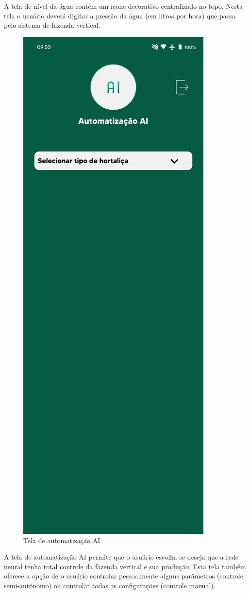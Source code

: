 A tela de nível da água contém um ícone decorativo centralizado no topo. Nesta tela o usuário deverá digitar a pressão da água (em litros por hora) que passa pelo sistema de fazenda vertical.
\clearpage
\begin{figure}[!h]
\centering
\caption{Tela de automatização AI}
\label{fig:picture11}
\includegraphics[scale=0.2]{Illustrations/Picture11.png}
\end{figure}
A tela de automatização AI permite que o usuário escolha se deseja que a rede neural tenha total controle da fazenda vertical e sua produção. Esta tela também oferece a opção de o usuário controlar pessoalmente alguns parâmetros (controle semi-autônomo) ou controlar todas as configurações (controle manual).
            

